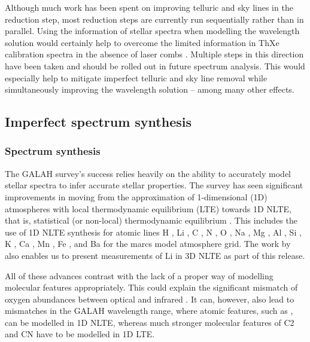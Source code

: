 \documentclass[
  journal=pasa,
  manuscript=research-paper, %
  year=2024,
  volume=37
]{cup-journal}
\newcommand\ion[2]{\text{#1\,\textsc{\lowercase{#2}}}}	%
\begin{document}
Although much work has been spent on improving telluric and sky lines in the reduction step, most reduction steps are currently run sequentially rather than in parallel. Using the information of stellar spectra when modelling the wavelength solution would certainly help to overcome the limited information in ThXe calibration spectra in the absence of laser combs \citep{Kos2018b}. Multiple steps in this direction have been taken \citep{Saydjari2023} and should be rolled out in future spectrum analysis. This would especially help to mitigate imperfect telluric and sky line removal while simultaneously improving the wavelength solution -- among many other effects.

\subsection{Imperfect spectrum synthesis} \label{sec:caveats_synthesis}

\subsubsection{Spectrum synthesis}

The GALAH survey's success relies heavily on the ability to accurately model stellar spectra to infer accurate stellar properties. The survey has seen significant improvements in moving from the approximation of 1-dimensional (1D) atmospheres with local thermodynamic equilibrium (LTE) towards 1D NLTE, that is, statistical (or non-local) thermodynamic equilibrium \citep{Amarsi2020}. This includes the use of 1D NLTE synthesis for atomic lines  H \citep{Amarsi2018}, Li \citep{Lind2009, Wang2020}, C \citep{Amarsi2019}, N \citep{Amarsi2020b}, O \citep{Amarsi2018b}, Na \citep{Lind2011}, Mg \citep{Osorio2015}, Al \citep{Nordlander2017}, Si \citep{Amarsi2017}, K \citep{Reggiani2019}, Ca \citep{Osorio2019}, Mn \citep{Bergemann2019b}, Fe \citep{Amarsi2018, Amarsi2022}, and Ba \citep{Gallagher2020} for the {\sc marcs} model atmosphere grid. The work by \citet{Wang2024} also enables us to present measurements of Li in 3D NLTE as part of this release.

All of these advances contrast with the lack of a proper way of modelling molecular features appropriately. This could explain the significant mismatch of oxygen abundances between optical and infrared \citep[compare e.g.][]{Bensby2014, SDSSDR17}. It can, however, also lead to mismatches in the GALAH wavelength range, where atomic features, such as \ion{C}{I}, can be modelled in 1D NLTE, whereas much stronger molecular features of C2 and CN have to be modelled in 1D LTE.
\end{document}
